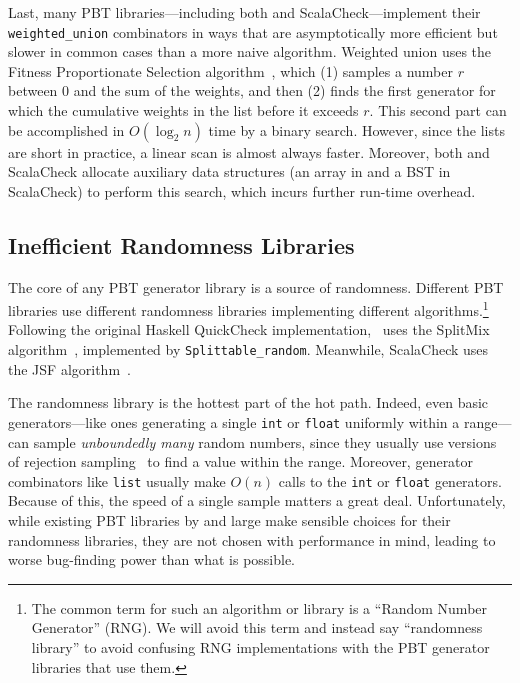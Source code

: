 \documentclass[acmsmall]{acmart}
\theoremstyle{definition}
\begin{document}
Last, many PBT libraries---including both \bq and ScalaCheck---implement their \texttt{weighted\_union} combinators
in ways that are asymptotically more efficient but slower in common cases than a more naive algorithm.
Weighted union uses the Fitness Proportionate Selection algorithm~\cite{geneticalgorithm}, which (1) samples a number $r$
between $0$ and the sum of the weights, and then (2) finds the first generator for which the cumulative
weights in the list before it exceeds $r$. This second part can be accomplished in $O(\log_2 n)$ time by
a binary search. However, since the lists are short in practice, a linear scan is almost always faster.
Moreover, both \bq{} and ScalaCheck allocate auxiliary data structures (an array in \bq{} and a BST in ScalaCheck) to
perform this search, which incurs further run-time overhead.

\subsection{Inefficient Randomness Libraries}
\label{subsection:ineff-rand}
The core of any PBT generator library is a source of randomness.
Different PBT libraries use different randomness libraries implementing different algorithms.\footnote{The common term for such an algorithm or library is a ``Random Number
Generator'' (RNG). We will avoid this term and instead say ``randomness library''
to avoid confusing RNG implementations with the PBT generator libraries that
use them.}
Following the original Haskell QuickCheck implementation, \bq\ uses the SplitMix
algorithm~\cite{splitmix}, implemented by \texttt{Splittable\_random}. Meanwhile,
ScalaCheck uses the JSF algorithm~\cite{jsf}.

The randomness library is the hottest part of the hot path.
Indeed, even basic generators---like ones generating a single \texttt{int} or \texttt{float} uniformly within a range---can sample \emph{unboundedly many}
random numbers, since they usually use versions of rejection sampling~\cite{vn51} to find a value within the range.
Moreover, generator combinators like \texttt{list} usually make $O(n)$ calls to the \texttt{int} or \texttt{float} generators.
Because of this, the speed of a single sample matters a great deal. Unfortunately,
while existing PBT libraries by and large make sensible choices for their randomness libraries,
they are not chosen with performance in mind, leading to worse bug-finding power than what is possible.
\end{document}
